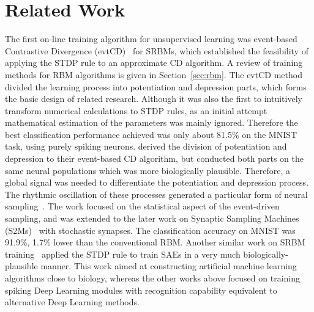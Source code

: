 \section{Related Work}
\label{sec:SRM_related}
The first on-line training algorithm for unsupervised learning was event-based Contrastive Divergence (evtCD)~\citep{neil2013online} for SRBMs, which established the feasibility of applying the STDP rule to an approximate CD algorithm.
A review of training methods for RBM algorithms is given in Section~\ref{sec:rbm}.
The evtCD method divided the learning process into potentiation and depression parts, which forms the basic design of related research.
Although it was also the first to intuitively transform numerical calculations to STDP rules, as an initial attempt mathematical estimation of the parameters was mainly ignored.
Therefore the best classification performance achieved was only about 81.5\% on the MNIST task, using purely spiking neurons.
\citet{neftci2013event} derived the division of potentiation and depression to their event-based CD algorithm, but conducted both parts on the same neural populations which was more biologically plausible.
Therefore, a global signal was needed to differentiate the potentiation and depression process.
The rhythmic oscillation of these processes generated a particular form of neural sampling~\citep{petrovici2013stochastic}.
The work focused on the statistical aspect of the event-driven sampling, and was extended to the later work on Synaptic Sampling Machines (S2Ms)~\citep{neftci2016stochastic} with stochastic synapses.
The classification accuracy on MNIST was 91.9\%, 1.7\% lower than the conventional RBM.
Another similar work on SRBM training~\citep{burbank2015mirrored} applied the STDP rule to train SAEs in a very much biologically-plausible manner.
This work aimed at constructing artificial machine learning algorithms close to biology, whereas the other works above focused on training spiking Deep Learning modules with recognition capability equivalent to alternative Deep Learning methods.


